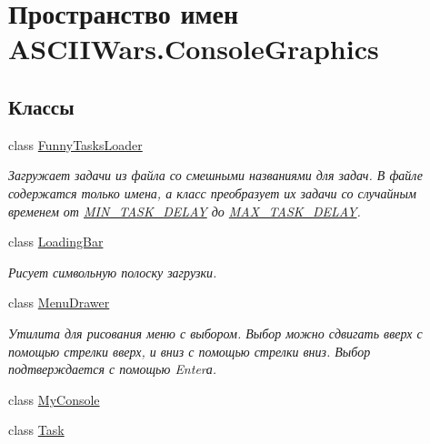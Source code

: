 \hypertarget{namespace_a_s_c_i_i_wars_1_1_console_graphics}{}\section{Пространство имен A\+S\+C\+I\+I\+Wars.\+Console\+Graphics}
\label{namespace_a_s_c_i_i_wars_1_1_console_graphics}
\subsection*{Классы}
\begin{DoxyCompactItemize}
\item 
class \hyperlink{class_a_s_c_i_i_wars_1_1_console_graphics_1_1_funny_tasks_loader}{Funny\+Tasks\+Loader}
\begin{DoxyCompactList}\small\item\em Загружает задачи из файла со смешными названиями для задач. В файле содержатся только имена, а класс преобразует их задачи со случайным временем от \hyperlink{class_a_s_c_i_i_wars_1_1_console_graphics_1_1_funny_tasks_loader_a9008864a7b23b6e86b350b5c2097151c}{M\+I\+N\+\_\+\+T\+A\+S\+K\+\_\+\+D\+E\+L\+AY} до \hyperlink{class_a_s_c_i_i_wars_1_1_console_graphics_1_1_funny_tasks_loader_a0c34f365b46e3cc7e9974d5412b05f6c}{M\+A\+X\+\_\+\+T\+A\+S\+K\+\_\+\+D\+E\+L\+AY}. \end{DoxyCompactList}\item 
class \hyperlink{class_a_s_c_i_i_wars_1_1_console_graphics_1_1_loading_bar}{Loading\+Bar}
\begin{DoxyCompactList}\small\item\em Рисует символьную полоску загрузки. \end{DoxyCompactList}\item 
class \hyperlink{class_a_s_c_i_i_wars_1_1_console_graphics_1_1_menu_drawer}{Menu\+Drawer}
\begin{DoxyCompactList}\small\item\em Утилита для рисования меню с выбором. Выбор можно сдвигать вверх с помощью стрелки вверх, и вниз с помощью стрелки вниз. Выбор подтверждается с помощью Enter\textquotesingle{}а. \end{DoxyCompactList}\item 
class \hyperlink{class_a_s_c_i_i_wars_1_1_console_graphics_1_1_my_console}{My\+Console}
\item 
class \hyperlink{class_a_s_c_i_i_wars_1_1_console_graphics_1_1_task}{Task}
\end{DoxyCompactItemize}
